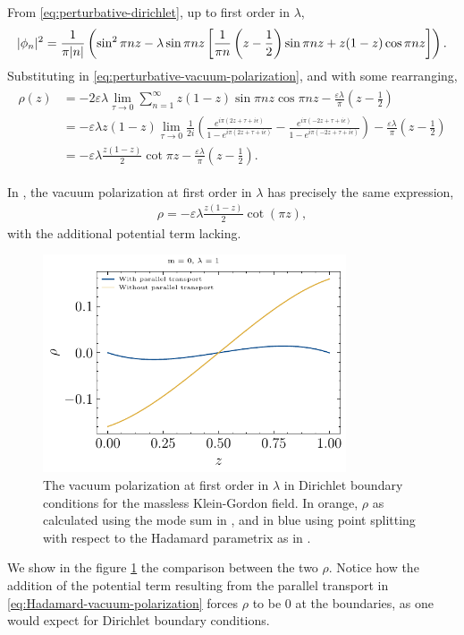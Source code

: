 From \eqref{eq:perturbative-dirichlet}, up to first order in $\lambda$,
\begin{align}
	\lvert \phi_n\rvert ^2 = \frac{1}{\pi\abs{n}} \left( \sin^2\pi n z - \lambda \sin\pi n z \left[ \frac{1}{\pi n } \left( z - \frac{1}{2} \right) \sin \pi n z + z (1- z) \cos \pi n z\right]  \right) .
\end{align}
Substituting in \eqref{eq:perturbative-vacuum-polarization}, and with some rearranging, 
\begin{align}
	\begin{split}
		\rho(z) &= -2\varepsilon \lambda \lim_{\tau \to 0} \sum_{n=1}^{\infty} z(1-z) \sin \pi n z  \cos \pi nz - \frac{\varepsilon \lambda}{\pi} \left( z-\frac{1}{2} \right) \\
		&= -\varepsilon\lambda  z(1-z) \lim_{\tau \to 0} \frac{1}{2i} 
		\left(
			\frac{e^{i \pi (2 z + \tau + i\epsilon)}}{1 - e^{i\pi( 2z + \tau + i\epsilon) }} 
			- \frac{e^{i \pi (-2 z + \tau + i\epsilon)}}{1 - e^{i\pi( -2z + \tau + i\epsilon) }} 
		\right) 
		- \frac{\varepsilon\lambda}{\pi} \left( z-\frac{1}{2} \right) \\
		&= -\varepsilon \lambda  \frac{z(1-z)}{2} \cot \pi z	- \frac{\varepsilon\lambda}{\pi} \left( z-\frac{1}{2} \right).
	\end{split}
\end{align}

In \cite{Ambj1983}, the vacuum polarization at first order in $\lambda$ has precisely the same expression,
\begin{align}
	\rho  =  -  \varepsilon\lambda \frac{z (1-z)}{2} \cot(\pi z),
\end{align}
with the additional potential term lacking.

\begin{figure}[t]
	\centering
	\includegraphics[width=0.8\textwidth]{figures/dirichlet/hambjorn.pdf}
	\caption{The vacuum polarization at first order in $\lambda$ in Dirichlet boundary conditions for the massless Klein-Gordon field. In orange, $\rho$ as calculated using the mode sum in \cite{Ambj1983}, and in blue using point splitting with respect to the Hadamard parametrix as in \cite{Wernersson2020}. }
	\label{fig:perturbative-rho-comparison}
\end{figure}
We show in the figure \ref{fig:perturbative-rho-comparison} the comparison between the two $\rho$. Notice how the addition of the potential term resulting from the parallel transport in \eqref{eq:Hadamard-vacuum-polarization} forces $\rho$ to be 0 at the boundaries, as one would expect for Dirichlet boundary conditions. 
